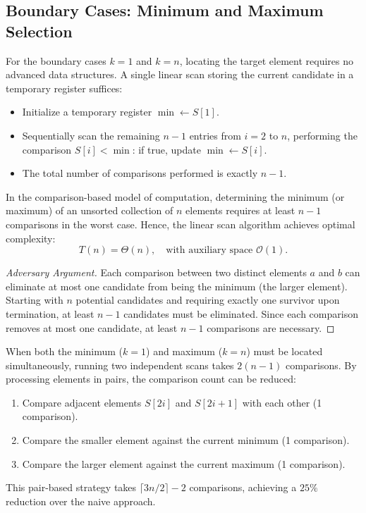\subsection{Boundary Cases: Minimum and Maximum Selection}
\label{subsec:selection-boundary-cases}

For the boundary cases $k = 1$ and $k = n$, locating the target element requires no advanced data structures. A single linear scan storing the current candidate in a temporary register suffices:

\begin{itemize}
  \item Initialize a temporary register $\min \leftarrow S[1]$.
  \item Sequentially scan the remaining $n - 1$ entries from $i = 2$ to $n$, performing the comparison $S[i] < \min$: if true, update $\min \leftarrow S[i]$.
  \item The total number of comparisons performed is exactly $n - 1$.
\end{itemize}

\begin{property}[Asymptotic Optimality for $k = 1$ and $k = n$]
In the comparison-based model of computation, determining the minimum (or maximum) of an unsorted collection of $n$ elements requires at least $n - 1$ comparisons in the worst case. Hence, the linear scan algorithm achieves optimal complexity:
\begin{equation}
  T(n) = \Theta(n), \quad \text{with auxiliary space } \mathcal{O}(1).
\end{equation}
\end{property}

\begin{proof}[Adversary Argument]
Each comparison between two distinct elements $a$ and $b$ can eliminate at most one candidate from being the minimum (the larger element). Starting with $n$ potential candidates and requiring exactly one survivor upon termination, at least $n - 1$ candidates must be eliminated. Since each comparison removes at most one candidate, at least $n - 1$ comparisons are necessary.
\end{proof}

\begin{property}
When both the minimum ($k=1$) and maximum ($k=n$) must be located simultaneously, running two independent scans takes $2(n - 1)$ comparisons. By processing elements in pairs, the comparison count can be reduced:
\begin{enumerate}
  \item Compare adjacent elements $S[2i]$ and $S[2i+1]$ with each other (1 comparison).
  \item Compare the smaller element against the current minimum (1 comparison).
  \item Compare the larger element against the current maximum (1 comparison).
\end{enumerate}
This pair-based strategy takes $\lceil 3n/2 \rceil - 2$ comparisons, achieving a $25\%$ reduction over the naive approach.
\end{property}


